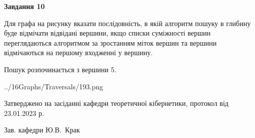 \documentclass[12pt, ukrainian]{article}
\begin{document}
{\begin {large}
{\begin {center}\textbf{Завдання 10}\end {center}}\par
Для графа на рисунку вказати послідовність, в якій алгоритм пошуку в глибину буде відмічати відвідані вершини, якщо списки суміжності вершин переглядаються алгоритмом за зростанням міток вершин та вершини відмічаються на першому вход\-женні у вершину.\par
Пошук розпочинається з вершини 5.\par

\begin{center}
	{../16Graphs/Traversals/193.png}
\end{center}\par
\newpage


\end {large}
}
{\smallskip \begin {small} Затверджено на засіданні кафедри теоретичної кібернетики, протокол  від   23.01.2023 р.\par\smallskip\smallskip
{\parbox {6.5 cm}{Зав. кафедри \dotfill Ю.В.~Крак}} \end{small}}
\end{document}

